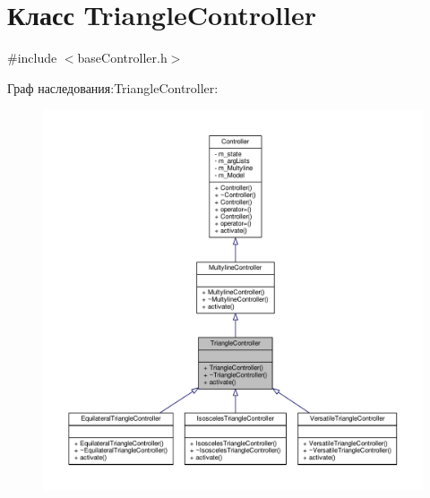 \hypertarget{class_triangle_controller}{\section{Класс Triangle\-Controller}
\label{class_triangle_controller}
}


{\ttfamily \#include $<$base\-Controller.\-h$>$}



Граф наследования\-:Triangle\-Controller\-:
\nopagebreak
\begin{figure}[H]
\begin{center}
\leavevmode
\includegraphics[width=350pt]{class_triangle_controller__inherit__graph}
\end{center}
\end{figure}


